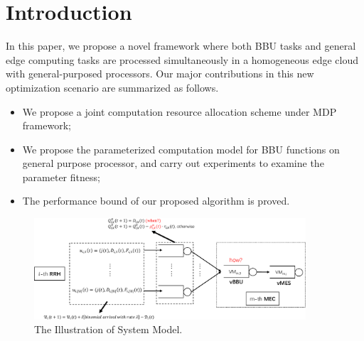 \section{Introduction}
\label{sec:intro}


In this paper, we propose a novel framework where both BBU tasks and general edge computing tasks are processed simultaneously in a homogeneous edge cloud with general-purposed processors.
Our major contributions in this new optimization scenario are summarized as follows.
\begin{itemize}
    \item We propose a joint computation resource allocation scheme under MDP framework;
    \item We propose the parameterized computation model for BBU functions on general purpose processor, and carry out experiments to examine the parameter fitness;
    \item The performance bound of our proposed algorithm is proved.
\end{itemize}

\begin{figure}[htb!]
    \centering
    \includegraphics[width=0.9\textwidth]{images/cran-system-model.pdf}
    \caption{The Illustration of System Model.}
    \label{fig:system-model}
\end{figure}